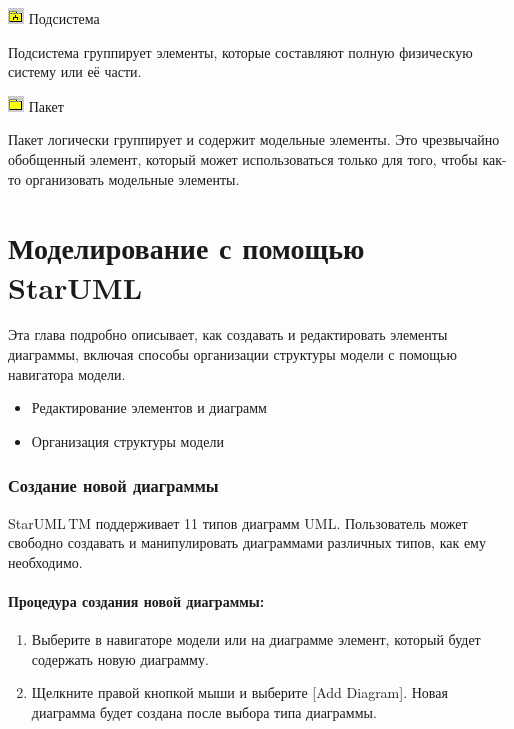 \documentclass[a4paper,12pt]{report}
\newcommand{\staruml}{StarUML\,\tm}
\begin{document}
\includegraphics[width=3ex]{images/subsistem}
Подсистема

Подсистема группирует элементы, которые составляют полную физическую систему или её части.

\includegraphics[width=3ex]{images/package}
Пакет

Пакет логически группирует и содержит модельные элементы. Это чрезвычайно обобщенный
элемент, который может использоваться только для того, чтобы как-то организовать модельные
элементы.

\chapter{Моделирование с помощью \staruml}
Эта глава подробно описывает, как создавать и редактировать элементы диаграммы, включая
способы организации структуры модели с помощью навигатора модели.
\begin{itemize}
	\item Редактирование элементов и диаграмм
	\item Организация структуры модели
\end{itemize}

\subsection*{Создание новой диаграммы}
\staruml TM поддерживает 11 типов диаграмм UML. Пользователь может свободно создавать и
манипулировать диаграммами различных типов, как ему необходимо.
\subsubsection*{Процедура создания новой диаграммы:}
\begin{enumerate}
	\item Выберите в навигаторе модели или на диаграмме элемент, который будет содержать новую
	диаграмму.
	\item Щелкните правой кнопкой мыши и выберите [Add Diagram]. Новая диаграмма будет
	создана после выбора типа диаграммы.
\end{enumerate}
\end{document}
